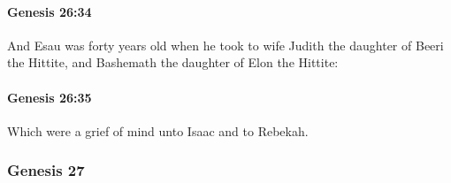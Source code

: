 		\paragraph{Genesis 26:34} %
			\label{GENESIS-26-34}

			And Esau was forty years old when he took to wife Judith the daughter of Beeri the Hittite, and Bashemath the daughter of Elon the Hittite:


		\paragraph{Genesis 26:35} %
			\label{GENESIS-26-35}

			Which were a grief of mind unto Isaac and to Rebekah.


	\subsubsection{Genesis 27} %
		\label{GENESIS-27}
		
		\phantom{.}
		




